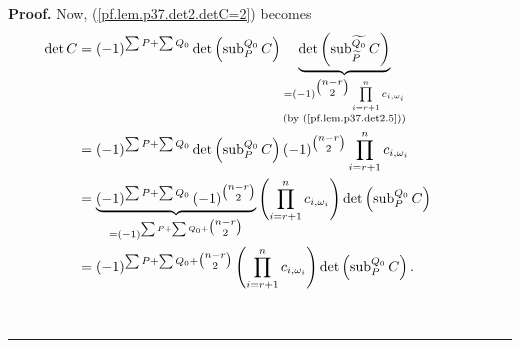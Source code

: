 \documentclass[numbers=enddot,12pt,final,onecolumn,notitlepage]{scrartcl}%
\theoremstyle{definition}
\newenvironment{proof}[1][Proof]{\noindent\textbf{#1.} }{\ \rule{0.5em}{0.5em}}
\let\sumnonlimits\sum
\let\prodnonlimits\prod
\renewcommand{\sum}{\sumnonlimits\limits}
\renewcommand{\prod}{\prodnonlimits\limits}
\begin{document}
\begin{enumerate}
\begin{proof}
Now, (\ref{pf.lem.p37.det2.detC=2}) becomes%
\begin{align}
\det C  &  =\left(  -1\right)  ^{\sum P+\sum Q_{0}}\det\left(
\operatorname*{sub}\nolimits_{P}^{Q_{0}}C\right)  \underbrace{\det\left(
\operatorname*{sub}\nolimits_{\widetilde{P}}^{\widetilde{Q_{0}}}C\right)
}_{\substack{=\left(  -1\right)  ^{\tbinom{n-r}{2}}\prod_{i=r+1}%
^{n}c_{i,\omega_{i}}\\\text{(by (\ref{pf.lem.p37.det2.5}))}}}\nonumber\\
&  =\left(  -1\right)  ^{\sum P+\sum Q_{0}}\det\left(  \operatorname*{sub}%
\nolimits_{P}^{Q_{0}}C\right)  \left(  -1\right)  ^{\tbinom{n-r}{2}}%
\prod_{i=r+1}^{n}c_{i,\omega_{i}}\nonumber\\
&  =\underbrace{\left(  -1\right)  ^{\sum P+\sum Q_{0}}\left(  -1\right)
^{\tbinom{n-r}{2}}}_{=\left(  -1\right)  ^{\sum P+\sum Q_{0}+\tbinom{n-r}{2}}%
}\left(  \prod_{i=r+1}^{n}c_{i,\omega_{i}}\right)  \det\left(
\operatorname*{sub}\nolimits_{P}^{Q_{0}}C\right) \nonumber\\
&  =\left(  -1\right)  ^{\sum P+\sum Q_{0}+\tbinom{n-r}{2}}\left(
\prod_{i=r+1}^{n}c_{i,\omega_{i}}\right)  \det\left(  \operatorname*{sub}%
\nolimits_{P}^{Q_{0}}C\right)
.\ \ \ \ \ \ \ \ \ \ \ \ \ \label{pf.lem.p37.det2.detC=7}%
\end{align}



\end{proof}
\end{enumerate}
\end{document}
